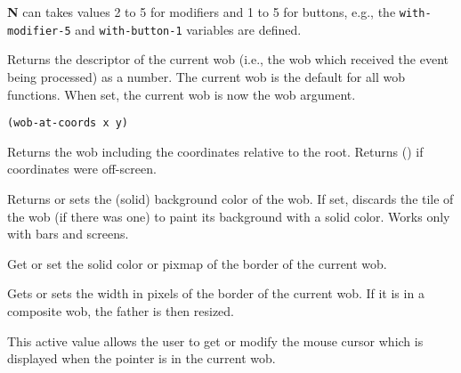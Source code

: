 {\bf N} can takes values 2 to 5 for modifiers and 1 to 5 for buttons, e.g.,
the \verb"with-modifier-5" and \verb"with-button-1" variables are defined.

        

Returns the descriptor of the current wob (i.e., the wob which received the
event being processed) as a {\WOOL} number.  The current wob is the default for
all wob functions.  When set, the current wob is now the wob argument.


{\usagefont\begin{verbatim}
(wob-at-coords x y)
\end{verbatim}}\usageupspace

Returns the wob including the coordinates relative to the root. Returns () if
coordinates were off-screen.

        

Returns or sets the (solid) background color of the wob. If set, discards the
tile of the wob (if there was one) to paint its background with a solid color.
Works only with bars and screens.

        

Get or set the solid color or pixmap of the border of the current wob.

        

Gets or sets the width in pixels of the border of the current wob.  If it is in
a composite wob, the father is then resized.



This active value allows the user to get or modify the mouse cursor which
is displayed when the pointer is in the current wob.

        

